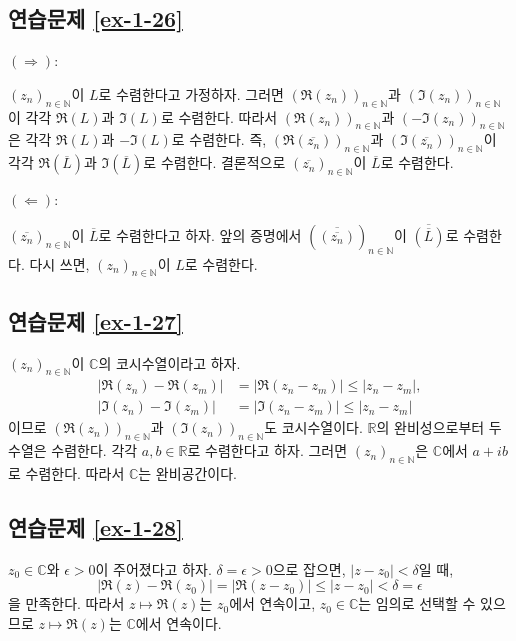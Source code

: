 \subsection*{연습문제 \ref{ex-1-26}}

$(\Rightarrow):$

$(z_n)_{n\in\mathbb N}$이 $L$로 수렴한다고 가정하자.
그러면 $(\Re(z_n))_{n\in\mathbb N}$과 
$(\Im(z_n))_{n\in\mathbb N}$이 각각 
$\Re(L)$과 $\Im(L)$로 수렴한다.
따라서 $(\Re(z_n))_{n\in\mathbb N}$과 
$(-\Im(z_n))_{n\in\mathbb N}$은 각각 
$\Re(L)$과 $-\Im(L)$로 수렴한다.
즉, $(\Re(\overline{z_n}))_{n\in\mathbb N}$과 
$(\Im(\overline{z_n}))_{n\in\mathbb N}$이 각각 
$\Re(\overline{L})$과 $\Im(\overline{L})$로 수렴한다.
결론적으로 $(\overline{z_n})_{n\in\mathbb N}$이 $\overline{L}$로 수렴한다.

\noindent $(\Leftarrow):$ 

$(\overline{z_n})_{n\in\mathbb N}$이 $\overline{L}$로 수렴한다고 하자.
앞의 증명에서 $(\overline{(\overline{z_n})})_{n\in\mathbb N}$이 
$\overline{(\overline{L})}$로 수렴한다.
다시 쓰면, $(z_n)_{n\in\mathbb N}$이 $L$로 수렴한다.

\subsection*{연습문제 \ref{ex-1-27}}

$(z_n)_{n\in\mathbb N}$이 $\mathbb C$의 코시수열이라고 하자.
\begin{align*}
|\Re(z_n) - \Re(z_m)| &= |\Re(z_n-z_m)| \le |z_n - z_m|, \\
|\Im(z_n) - \Im(z_m)| &= |\Im(z_n-z_m)| \le |z_n - z_m|
\end{align*}
이므로  $(\Re(z_n))_{n\in\mathbb N}$과 
$(\Im(z_n))_{n\in\mathbb N}$도 코시수열이다.
$\mathbb R$의 완비성으로부터 두 수열은 수렴한다.
각각 $a,b\in\mathbb R$로 수렴한다고 하자.
그러면 $(z_n)_{n\in\mathbb N}$은 $\mathbb C$에서 $a+ib$로 수렴한다.
따라서 $\mathbb C$는 완비공간이다.

\subsection*{연습문제 \ref{ex-1-28}}

$z_0\in\mathbb C$와 $\epsilon >0$이 주어졌다고 하자.
$\delta = \epsilon>0$으로 잡으면,
$|z-z_0|< \delta$일 때,
\[
|\Re(z) - \Re(z_0)| = |\Re(z-z_0)| \le |z-z_0| < \delta = \epsilon
\]
을 만족한다.
따라서 $z \mapsto \Re(z)$는 $z_0$에서 연속이고,
$z_0\in\mathbb C$는 임의로 선택할 수 있으므로
$z \mapsto \Re(z)$는 $\mathbb C$에서 연속이다.

